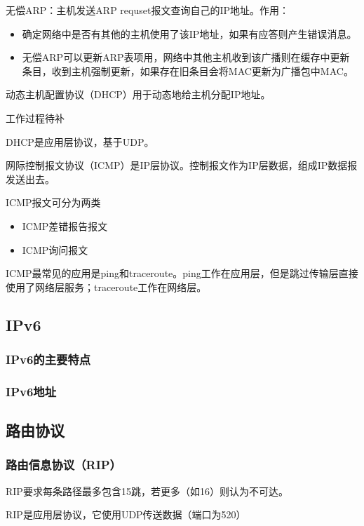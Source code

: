 \documentclass[12pt, a4paper, oneside]{ctexart}
\begin{document}
无偿ARP：主机发送ARP requset报文查询自己的IP地址。作用：
\begin{itemize}
    \item 确定网络中是否有其他的主机使用了该IP地址，如果有应答则产生错误消息。
    \item 无偿ARP可以更新ARP表项用，网络中其他主机收到该广播则在缓存中更新条目，收到主机强制更新，如果存在旧条目会将MAC更新为广播包中MAC。
\end{itemize}

动态主机配置协议（DHCP）用于动态地给主机分配IP地址。

工作过程待补

DHCP是应用层协议，基于UDP。

网际控制报文协议（ICMP）是IP层协议。控制报文作为IP层数据，组成IP数据报发送出去。

ICMP报文可分为两类
\begin{itemize}
    \item ICMP差错报告报文
    \item ICMP询问报文
\end{itemize}

ICMP最常见的应用是ping和traceroute。ping工作在应用层，但是跳过传输层直接使用了网络层服务；traceroute工作在网络层。

\subsection{IPv6}

\subsubsection{IPv6的主要特点}

\subsubsection{IPv6地址}

\subsection{路由协议}

\subsubsection{路由信息协议（RIP）}

RIP要求每条路径最多包含15跳，若更多（如16）则认为不可达。

RIP是应用层协议，它使用UDP传送数据（端口为520）
\end{document}
